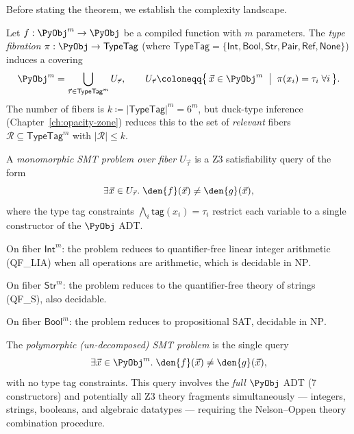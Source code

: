 Before stating the theorem, we establish the complexity landscape.

\begin{definition}
\label{def:type-fiber-decomp}
Let $f : \PyObj^m \to \PyObj$ be a compiled function with $m$
parameters.  The \emph{type fibration}
$\pi : \PyObj \to \mathsf{TypeTag}$ (where
$\mathsf{TypeTag} = \{\mathsf{Int}, \mathsf{Bool}, \mathsf{Str},
\mathsf{Pair}, \mathsf{Ref}, \mathsf{None}\}$) induces a covering
\[
  \PyObj^m = \bigcup_{\vec{\tau} \in \mathsf{TypeTag}^m}
  U_{\vec{\tau}},
  \qquad
  U_{\vec{\tau}}
  \coloneqq
  \bigl\{\, \vec{x} \in \PyObj^m
  \;\bigm|\;
  \pi(x_i) = \tau_i \;\forall i
  \,\bigr\}.
\]
The number of fibers is $k \coloneqq |\mathsf{TypeTag}|^m = 6^m$,
but duck-type inference (Chapter~\ref{ch:opacity-zone}) reduces
this to the set of \emph{relevant} fibers $\mathcal{R} \subseteq
\mathsf{TypeTag}^m$ with $|\mathcal{R}| \leq k$.
\end{definition}

\begin{definition}
\label{def:mono-smt}
A \emph{monomorphic SMT problem over fiber $U_{\vec{\tau}}$} is a
Z3 satisfiability query of the form
\[
  \exists \vec{x} \in U_{\vec{\tau}}.\;
  \den{f}(\vec{x}) \neq \den{g}(\vec{x}),
\]
where the type tag constraints
$\bigwedge_i \mathsf{tag}(x_i) = \tau_i$ restrict each variable to
a single constructor of the $\PyObj$ ADT.

On fiber $\mathsf{Int}^m$: the problem reduces to quantifier-free
linear integer arithmetic (QF\_LIA) when all operations are
arithmetic, which is decidable in $\mathrm{NP}$.

On fiber $\mathsf{Str}^m$: the problem reduces to the quantifier-free
theory of strings (QF\_S), also decidable.

On fiber $\mathsf{Bool}^m$: the problem reduces to propositional
SAT, decidable in $\mathrm{NP}$.
\end{definition}

\begin{definition}
\label{def:poly-smt}
The \emph{polymorphic (un-decomposed) SMT problem} is the single query
\[
  \exists \vec{x} \in \PyObj^m.\;
  \den{f}(\vec{x}) \neq \den{g}(\vec{x}),
\]
with no type tag constraints.  This query involves the \emph{full}
$\PyObj$ ADT (7 constructors) and potentially all Z3 theory fragments
simultaneously — integers, strings, booleans, and algebraic datatypes
— requiring the Nelson--Oppen theory combination procedure.
\end{definition}

